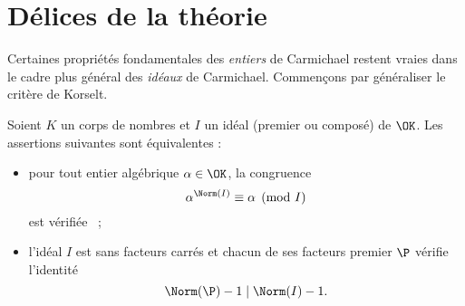 \section{Délices de la théorie}

Certaines propriétés fondamentales des \emph{entiers} de Carmichael restent vraies dans le cadre plus général des \emph{idéaux} de Carmichael. Commençons par généraliser le critère de Korselt.

\begin{theoreme}\label{korselt-generalise}
	Soient $K$ un corps de nombres et $I$ un idéal (premier ou composé) de $\OK$. Les assertions suivantes sont équivalentes :
	\begin{itemize}
		\item pour tout entier algébrique $\alpha \in \OK$, la congruence \[\alpha^{\Norm(I)} \equiv \alpha \pmod{I}\] est vérifiée ~;
		\item l'idéal $I$ est sans facteurs carrés et chacun de ses facteurs premier $\P$ vérifie l'identité \[\Norm(\P) - 1 \mid \Norm(I) - 1.\]
	\end{itemize}
\end{theoreme}

